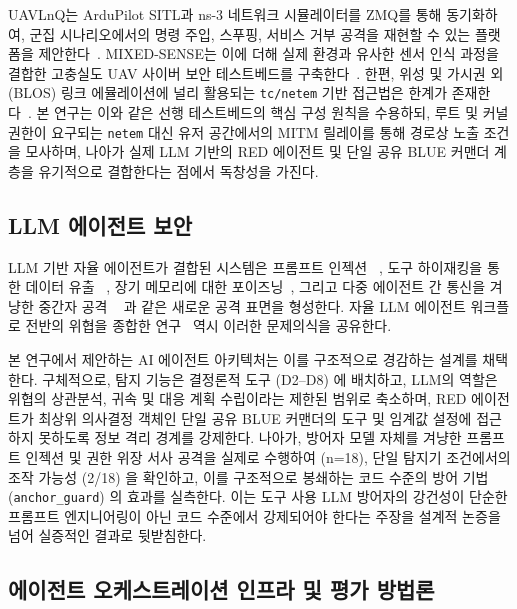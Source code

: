 UAVLnQ는 ArduPilot SITL과 ns-3 네트워크 시뮬레이터를 ZMQ를 통해 동기화하여, 군집 시나리오에서의 명령 주입, 스푸핑, 서비스 거부 공격을 재현할 수 있는 플랫폼을 제안한다~\cite{uavlnq}. MIXED-SENSE는 이에 더해 실제 환경과 유사한 센서 인식 과정을 결합한 고충실도 UAV 사이버 보안 테스트베드를 구축한다~\cite{mixed_sense}. 한편, 위성 및 가시권 외 (BLOS) 링크 에뮬레이션에 널리 활용되는 \texttt{tc/netem} 기반 접근법은 한계가 존재한다~\cite{theaterq}.  본 연구는 이와 같은 선행 테스트베드의 핵심 구성 원칙을 수용하되, 루트 및 커널 권한이 요구되는 \texttt{netem} 대신 유저 공간에서의 MITM 릴레이를 통해 경로상 노출 조건을 모사하며, 나아가 실제 LLM 기반의 RED 에이전트 및 단일 공유 BLUE 커맨더 계층을 유기적으로 결합한다는 점에서 독창성을 가진다.

\subsection{LLM 에이전트 보안}

LLM 기반 자율 에이전트가 결합된 시스템은 프롬프트 인젝션 ~\cite{prompt_to_protocol,owasp_promptinjection,zombie_agents}, 도구 하이재킹을 통한 데이터 유출 ~\cite{exfil_backdoor}, 장기 메모리에 대한 포이즈닝~\cite{memorygraft,memory_survey,smsr}, 그리고 다중 에이전트 간 통신을 겨냥한 중간자 공격 ~\cite{aitm,mas_security_considerations,seven_challenges_mas} 과 같은 새로운 공격 표면을 형성한다. 자율 LLM 에이전트 워크플로 전반의 위협을 종합한 연구~\cite{openclaw} 역시 이러한 문제의식을 공유한다.

본 연구에서 제안하는 AI 에이전트 아키텍처는 이를 구조적으로 경감하는 설계를 채택한다. 구체적으로, 탐지 기능은 결정론적 도구 (D2--D8) 에 배치하고, LLM의 역할은 위협의 상관분석, 귀속 및 대응 계획 수립이라는 제한된 범위로 축소하며, RED 에이전트가 최상위 의사결정 객체인 단일 공유 BLUE 커맨더의 도구 및 임계값 설정에 접근하지 못하도록 정보 격리 경계를 강제한다. 나아가, 방어자 모델 자체를 겨냥한 프롬프트 인젝션 및 권한 위장 서사 공격을 실제로 수행하여 (n=18), 단일 탐지기 조건에서의 조작 가능성 (2/18) 을 확인하고, 이를 구조적으로 봉쇄하는 코드 수준의 방어 기법 (\texttt{anchor\_guard}) 의 효과를 실측한다. 이는 도구 사용 LLM 방어자의 강건성이 단순한 프롬프트 엔지니어링이 아닌 코드 수준에서 강제되어야 한다는 주장을 설계적 논증을 넘어 실증적인 결과로 뒷받침한다.

\subsection{에이전트 오케스트레이션 인프라 및 평가 방법론}

